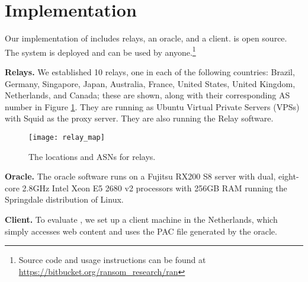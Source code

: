 \section{Implementation}

Our implementation of \system{} includes relays, an oracle, and 
a client. \system{} is open source.  The system is deployed and 
can be used by anyone.\footnote{Source code and usage instructions can be found at \url{https://bitbucket.org/ransom_research/ran}}

\textbf{Relays.}  We established 10 relays, one in each of the following countries: Brazil, 
Germany, Singapore, Japan, Australia, France, United States, United Kingdom, Netherlands, and Canada; these 
are shown, along with their corresponding AS number in Figure \ref{fig:relay_locations}.  
They are running as Ubuntu Virtual Private Servers (VPSs) with 
Squid as the proxy server.  They are also running the \system{} Relay software.

\begin{figure}[t!]
\centering
\texttt{[image: relay\_map]}
\caption{The locations and ASNs for \system{} relays.}
\label{fig:relay_locations}
\end{figure}

\textbf{Oracle.}  The oracle software runs on a Fujitsu RX200 S8 server with dual, 
eight-core 2.8GHz Intel Xeon E5 2680 v2 processors with 256GB RAM running the 
Springdale distribution of Linux. 

\textbf{Client.} To evaluate \system{}, we set up a client 
machine in the Netherlands, which simply accesses web content and uses the PAC 
file generated by the oracle. 
